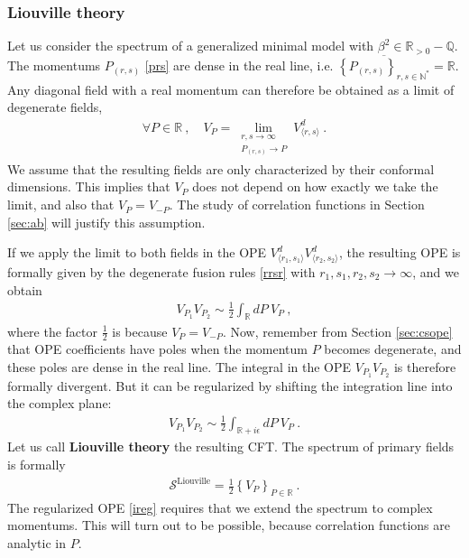 \documentclass[12pt, a4paper]{article}
\theoremstyle{break}
\begin{document}
\subsubsection{Liouville theory}\label{sec:liou}

Let us consider the spectrum of a generalized minimal model with $\beta^2\in\mathbb{R}_{>0}-\mathbb{Q}$. The momentums $P_{(r,s)}$ \eqref{prs} are dense in the real line, i.e. $\overline{\left\{ P_{(r,s)}\right\}_{r,s\in\mathbb{N}^*}} = \mathbb{R}$. Any diagonal field with a real momentum can therefore be obtained as a limit of degenerate fields,
\begin{align}
 \forall P\in\mathbb{R}\ , \quad V_P = \lim_{\substack{r,s\to\infty \\ P_{(r,s)}\to P}} V^d_{\langle r,s\rangle}\ .
 \label{vplim}
\end{align}
We assume that the resulting fields are only characterized by their conformal dimensions. This implies that $V_P$ does not depend on how exactly we take the limit, and also that $V_P=V_{-P}$. The study of correlation functions in Section \ref{sec:ab} will justify this assumption.

If we apply the limit to both fields in the OPE $V^d_{\langle r_1,s_1\rangle}V^d_{\langle r_2,s_2\rangle}$, the resulting OPE is formally given by the degenerate fusion rules \eqref{rrsr} with $r_1,s_1,r_2,s_2\to\infty$, and we obtain
\begin{align}
 \boxed{V_{P_1}V_{P_2} \sim \frac12 \int_\mathbb{R} dP\ V_P} \ ,
 \label{idpv}
\end{align}
where the factor $\frac12$ is because $V_P=V_{-P}$. Now, remember from Section \ref{sec:csope} that OPE coefficients have poles when the momentum $P$ becomes degenerate, and these poles are dense in the real line. The integral in the OPE $V_{P_1}V_{P_2}$ is therefore formally divergent. But it can be regularized by shifting the integration line into the complex plane:
\begin{align}
 V_{P_1}V_{P_2} \sim \frac12 \int_{\mathbb{R}+i\epsilon} dP\ V_P\ .
 \label{ireg}
\end{align}
Let us call \textbf{Liouville theory} the resulting CFT. The spectrum of primary fields is formally
\begin{align}
 \boxed{\mathcal{S}^\text{Liouville} = \frac12 \left\{ V_P\right\}_{P\in \mathbb{R}}}\ .
 \label{sliou}
\end{align}
The regularized OPE \eqref{ireg} requires that we extend the spectrum to complex momentums. This will turn out to be possible, because correlation functions are analytic in $P$. 
\end{document}
